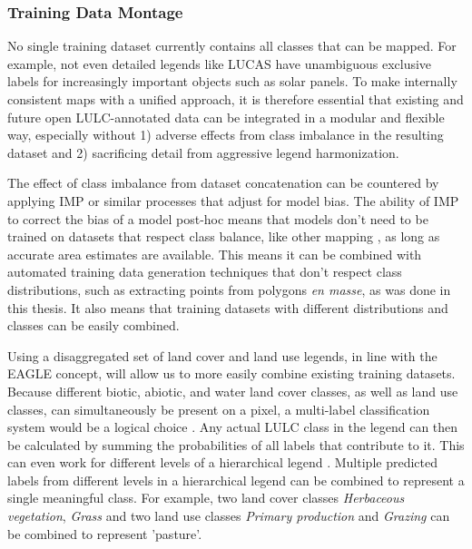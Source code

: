         \subsubsection{Training Data Montage}
        \label{syn:everything-trainingdata}

            No single training dataset currently contains all classes that can be mapped. For example, not even detailed legends like LUCAS have unambiguous exclusive labels for increasingly important objects such as solar panels. To make internally consistent maps with a unified approach, it is therefore essential that existing and future open LULC-annotated data can be integrated in a modular and flexible way, especially without 1) adverse effects from class imbalance in the resulting dataset and 2) sacrificing detail from aggressive legend harmonization.
            
            The effect of class imbalance from dataset concatenation can be countered by applying IMP or similar processes that adjust for model bias. The ability of IMP to correct the bias of a model post-hoc means that models don't need to be trained on datasets that respect class balance, like other mapping \citep{waldner2016towards,kleinewillinghofer2022unbiased}, as long as accurate area estimates are available. This means it can be combined with automated training data generation techniques that don't respect class distributions, such as extracting points from polygons \textit{en masse}, as was done in this thesis. It also means that training datasets with different distributions and classes can be easily combined.
    
            Using a disaggregated set of land cover and land use legends, in line with the EAGLE concept, will allow us to more easily combine existing training datasets. Because different biotic, abiotic, and water land cover classes, as well as land use classes, can simultaneously be present on a pixel, a multi-label classification system would be a logical choice \citep{sumbul2020deep}. Any actual LULC class in the legend can then be calculated by summing the probabilities of all labels that contribute to it. This can even work for different levels of a hierarchical legend \citep{wehrmann2018hierarchical}. Multiple predicted labels from different levels in a hierarchical legend can be combined to represent a single meaningful class. For example, two land cover classes \textit{Herbaceous vegetation}, \textit{Grass} and two land use classes \textit{Primary production} and \textit{Grazing} can be combined to represent 'pasture'.


